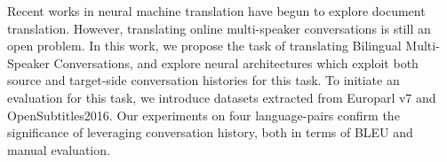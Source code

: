 Recent works in neural machine translation have begun to explore document translation. However, translating online multi-speaker conversations is still an open problem. In this work, we propose the task of translating Bilingual Multi-Speaker Conversations, and explore neural architectures which exploit both source and target-side conversation histories for this task. To initiate an evaluation for this task, we introduce datasets extracted from Europarl v7 and OpenSubtitles2016. Our experiments on four language-pairs confirm the significance of leveraging conversation history, both in terms of BLEU and manual evaluation.
